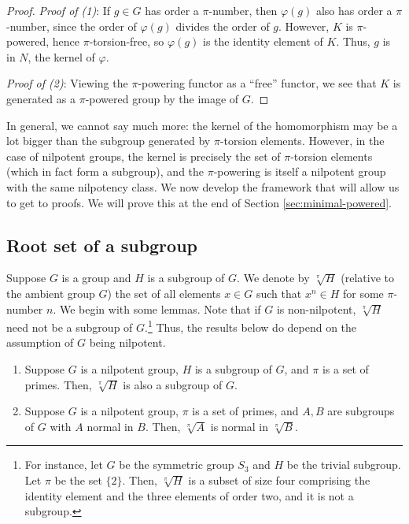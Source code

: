 \begin{proof}
  {\em Proof of (1)}: If $g \in G$ has order a $\pi$-number, then
  $\varphi(g)$ also has order a $\pi$-number, since the order of
  $\varphi(g)$ divides the order of $g$. However, $K$ is
  $\pi$-powered, hence $\pi$-torsion-free, so $\varphi(g)$ is the
  identity element of $K$. Thus, $g$ is in $N$, the kernel of
  $\varphi$.

  {\em Proof of (2)}: Viewing the $\pi$-powering functor as a ``free''
  functor, we see that $K$ is generated as a $\pi$-powered group by
  the image of $G$.
\end{proof}

In general, we cannot say much more: the kernel of the homomorphism
may be a lot bigger than the subgroup generated by $\pi$-torsion
elements. However, in the case of nilpotent groups, the kernel is
precisely the set of $\pi$-torsion elements (which in fact form a
subgroup), and the $\pi$-powering is itself a nilpotent group with the
same nilpotency class. We now develop the framework that will allow us
to get to proofs. We will prove this at the end of Section
\ref{sec:minimal-powered}.

\subsection{Root set of a subgroup}\label{sec:root-set}

Suppose $G$ is a group and $H$ is a subgroup of $G$. We denote by
$\sqrt[\pi]{H}$ (relative to the ambient group $G$) the set of all
elements $x \in G$ such that $x^n \in H$ for some $\pi$-number $n$. We
begin with some lemmas. Note that if $G$ is non-nilpotent,
$\sqrt[\pi]{H}$ need not be a subgroup of $G$.\footnote{For instance,
  let $G$ be the symmetric group $S_3$ and $H$ be the trivial
  subgroup. Let $\pi$ be the set $\{ 2 \}$. Then, $\sqrt[\pi]{H}$ is a
  subset of size four comprising the identity element and the three
  elements of order two, and it is not a subgroup.} Thus, the results
below do depend on the assumption of $G$ being nilpotent.

\begin{theorem}\label{thm:nilpotent-pi-root-subgroup}
  \begin{enumerate}
  \item Suppose $G$ is a nilpotent group, $H$ is a subgroup of $G$,
    and $\pi$ is a set of primes. Then, $\sqrt[\pi]{H}$ is also a
    subgroup of $G$.
  \item Suppose $G$ is a nilpotent group, $\pi$ is a set of primes,
    and $A,B$ are subgroups of $G$ with $A$ normal in $B$. Then,
    $\sqrt[\pi]{A}$ is normal in $\sqrt[\pi]{B}$.
  \end{enumerate}
\end{theorem}

